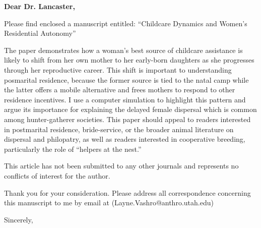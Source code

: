 \documentclass{letter}
\begin{document}

\begin{letter}{} %


\opening{\textbf{Dear Dr. Lancaster,}}
 
Please find enclosed a manuscript entitled: “Childcare Dynamics and Women's Residential Autonomy”

The paper demonstrates how a woman’s best source of childcare assistance is likely to shift from her own mother to her early-born daughters as she progresses through her reproductive career.  This shift is important to understanding posmarital residence, because the former source is tied to the natal camp while the latter offers a mobile alternative and frees mothers to respond to other residence incentives.  I use a computer simulation to highlight this pattern and argue its importance for explaining the delayed female dispersal which is common among hunter-gatherer societies.  This paper should appeal to readers interested in postmarital residence, bride-service, or the broader animal literature on dispersal and philopatry, as well as readers interested in cooperative breeding, particularly the role of ``helpers at the nest.'' 

This article has not been submitted to any other journals and represents no conflicts of interest for the author.

Thank you for your consideration.  Please address all correspondence concerning this manuscript to me by email at (Layne.Vashro@anthro.utah.edu)


\vspace{2\parskip} %
\closing{Sincerely,\\
 \\
}




\end{letter}
 
\end{document}
